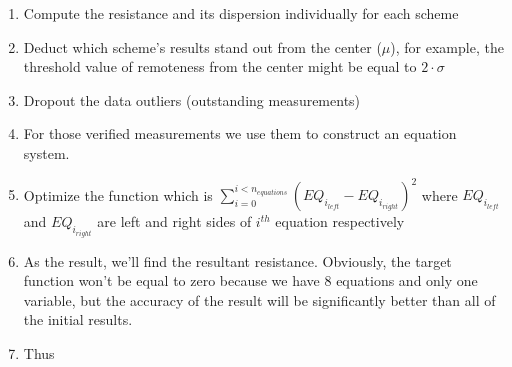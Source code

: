 \documentclass[11pt]{memoir}
\begin{document}
    \begin{enumerate}
        \item Compute the resistance and its dispersion individually for each scheme
        \item Deduct which scheme's results stand out from the center ($\mu$), for example, the threshold value of remoteness from the center might be equal to $2 \cdot \sigma$
        \item Dropout the data outliers (outstanding measurements)
        \item For those verified measurements we use them to construct an equation system.
        \item Optimize the function which is ${\sum_{i=0}^{i<n_{equations}} (EQ_{i_{left}} - EQ_{i_{right}}) ^ 2}$\newline
            where $EQ_{i_{left}}$ and $EQ_{i_{right}}$ are left and right sides of $i^{th}$ equation respectively
        \item As the result, we'll find the resultant resistance.\newline
        Obviously, the target function won't be equal to zero because we have 8 equations and only one variable, but the accuracy of the result will be significantly better than all of the initial results.
        \item Thus 
    \end{enumerate}


\end{document}
